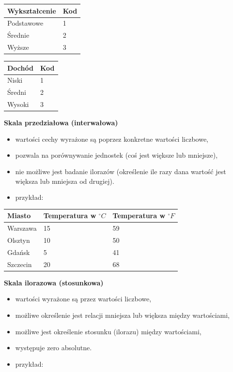 \documentclass[
  polish,
  letterpaper,
  DIV=11,
  numbers=noendperiod]{scrreprt}
\newcounter{none} %
\providecommand{\tightlist}{%
  \setlength{\itemsep}{0pt}\setlength{\parskip}{0pt}}
\begin{document}
{\def\LTcaptype{none} %
\begin{longtable}[]{@{}ll@{}}
\toprule\noalign{}
Wykształcenie & Kod \\
\midrule\noalign{}
\endhead
\bottomrule\noalign{}
\endlastfoot
Podstawowe & 1 \\
Średnie & 2 \\
Wyższe & 3 \\
\end{longtable}
}

{\def\LTcaptype{none} %
\begin{longtable}[]{@{}ll@{}}
\toprule\noalign{}
Dochód & Kod \\
\midrule\noalign{}
\endhead
\bottomrule\noalign{}
\endlastfoot
Niski & 1 \\
Średni & 2 \\
Wysoki & 3 \\
\end{longtable}
}

\textbf{Skala przedziałowa (interwałowa)}

\begin{itemize}
\tightlist
\item
  wartości cechy wyrażone są poprzez konkretne wartości liczbowe,
\item
  pozwala na porównywanie jednostek (coś jest większe lub mniejsze),
\item
  nie możliwe jest badanie ilorazów (określenie ile razy dana wartość
  jest większa lub mniejsza od drugiej).
\item
  przykład:
\end{itemize}

{\def\LTcaptype{none} %
\begin{longtable}[]{@{}lll@{}}
\toprule\noalign{}
Miasto & Temperatura w \(^{\circ}C\) & Temperatura w \(^{\circ}F\) \\
\midrule\noalign{}
\endhead
\bottomrule\noalign{}
\endlastfoot
Warszawa & 15 & 59 \\
Olsztyn & 10 & 50 \\
Gdańsk & 5 & 41 \\
Szczecin & 20 & 68 \\
\end{longtable}
}

\textbf{Skala ilorazowa (stosunkowa)}

\begin{itemize}
\tightlist
\item
  wartości wyrażone są przez wartości liczbowe,
\item
  możliwe określenie jest relacji mniejsza lub większa między
  wartościami,
\item
  możliwe jest określenie stosunku (ilorazu) między wartościami,
\item
  występuje zero absolutne.
\item
  przykład:
\end{itemize}
\end{document}
